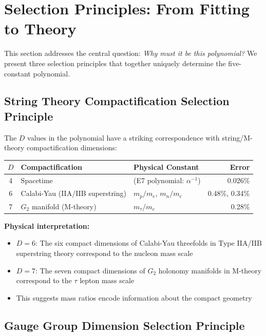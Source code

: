 \documentclass[11pt,a4paper]{article}
\begin{document}
\section{Selection Principles: From Fitting to Theory}

This section addresses the central question: \textit{Why must it be this polynomial?} We present three selection principles that together uniquely determine the five-constant polynomial.

\subsection{String Theory Compactification Selection Principle}

The $D$ values in the polynomial have a striking correspondence with string/M-theory compactification dimensions:

\begin{center}
\begin{tabular}{cllr}
\hline
$D$ & Compactification & Physical Constant & Error \\
\hline
4 & Spacetime & (E7 polynomial: $\alpha^{-1}$) & 0.026\% \\
6 & Calabi-Yau (IIA/IIB superstring) & $m_p/m_e$, $m_n/m_e$ & 0.48\%, 0.34\% \\
7 & $G_2$ manifold (M-theory) & $m_\tau/m_e$ & 0.28\% \\
\hline
\end{tabular}
\end{center}

\textbf{Physical interpretation:}
\begin{itemize}
    \item $D = 6$: The six compact dimensions of Calabi-Yau threefolds in Type IIA/IIB superstring theory correspond to the nucleon mass scale
    \item $D = 7$: The seven compact dimensions of $G_2$ holonomy manifolds in M-theory correspond to the $\tau$ lepton mass scale
    \item This suggests mass ratios encode information about the compact geometry
\end{itemize}

\subsection{Gauge Group Dimension Selection Principle}
\end{document}
